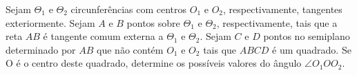 Sejam $\Theta_1$ e $\Theta_2$ circunferências com centros $O_1$ e $O_2$, respectivamente, tangentes exteriormente. Sejam $A$ e $B$ pontos sobre $\Theta_1$ e $\Theta_2$, respectivamente, tais que a reta $AB$ é tangente comum externa a $\Theta_1$ e $\Theta_2$. Sejam $C$ e $D$ pontos no semiplano determinado por $AB$ que não contém $O_1$ e $O_2$ tais que $ABCD$ é um quadrado. Se O é o centro deste quadrado, determine os possíveis valores do ângulo $\angle O_1OO_2$.